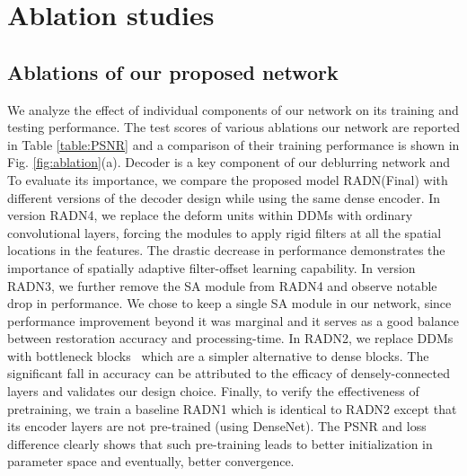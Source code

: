 \documentclass[letterpaper]{article} \usepackage{aaai20}  \usepackage{times}  \usepackage{helvet} \usepackage{courier}  \usepackage[hyphens]{url}  \usepackage{graphicx} \urlstyle{rm} \def\UrlFont{\rm}  \usepackage{graphicx}  \frenchspacing  \setlength{\pdfpagewidth}{8.5in}  \setlength{\pdfpageheight}{11in}
\begin{document}
\section{Ablation studies}



\begin{table}[t]
\centering
\caption{Quantitative comparison of different ablations of our baseline residual deblurring network on GoPro testset.
\label{TableAblationSingle}} 
	\vspace{-1.0em}
\end{table}

\subsection{Ablations of our proposed network}

We analyze the effect of individual components of our network on its training and testing performance. The test scores of various ablations our network are reported in Table \ref{table:PSNR} and  a comparison of their training performance is shown in Fig. \ref{fig:ablation}(a). Decoder is a key component of our deblurring network and To evaluate its importance, we compare the proposed model RADN(Final) with  different versions of the decoder design while using the same dense encoder. In version RADN4, we replace the deform units within DDMs with ordinary convolutional layers, forcing the modules to apply rigid filters at all the spatial locations in the features. The drastic decrease in performance demonstrates the importance of spatially adaptive filter-offset learning capability. In version RADN3, we further remove the SA module from RADN4 and observe notable drop in performance. We chose to keep a single SA module in our network, since performance improvement beyond it was marginal and it serves as a good balance between restoration accuracy and processing-time. In RADN2, we replace DDMs with bottleneck blocks~\cite{huang2017densely} which are a simpler alternative to dense blocks. The significant fall in accuracy can be attributed to the efficacy of densely-connected layers and validates our design choice. Finally, to verify the effectiveness of pretraining, we train a baseline RADN1 which is identical to RADN2 except that its encoder layers are not pre-trained (using DenseNet). The PSNR and loss difference clearly shows that such pre-training leads to better initialization in parameter space and eventually, better convergence.
\end{document}
